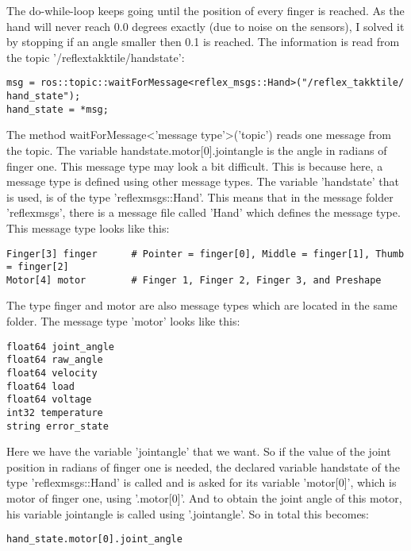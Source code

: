 \documentclass[11pt,a4paper]{report}
\begin{document}
The do-while-loop keeps going until the position of every finger is reached. As the hand will never reach 0.0 degrees exactly (due to noise on the sensors), I solved it by stopping if an angle smaller then 0.1 is reached. The information is read from the topic '/reflex\textunderscore takktile/hand\textunderscore state':
\begin{verbatim}
msg = ros::topic::waitForMessage<reflex_msgs::Hand>("/reflex_takktile/	hand_state");
hand_state = *msg;
\end{verbatim}
The method waitForMessage\textless 'message type'\textgreater ('topic') reads one message from the topic. The variable hand\textunderscore state.motor[0].joint\textunderscore angle is the angle in radians of finger one. This message type may look a bit difficult. This is because here, a message type is defined using other message types. The variable 'hand\textunderscore state' that is used, is of the type 'reflex\textunderscore msgs::Hand'. This means that in the message folder 'reflex\textunderscore msgs', there is a message file called 'Hand' which defines the message type. This message type looks like this:
\begin{verbatim}
Finger[3] finger      # Pointer = finger[0], Middle = finger[1], Thumb = finger[2]
Motor[4] motor        # Finger 1, Finger 2, Finger 3, and Preshape
\end{verbatim}
The type finger and motor are also message types which are located in the same folder. The message type 'motor' looks like this:
\begin{verbatim}
float64 joint_angle
float64 raw_angle
float64 velocity
float64 load
float64 voltage
int32 temperature
string error_state
\end{verbatim}
Here we have the variable 'joint\textunderscore angle' that we want. So if the value of the joint position in radians of finger one is needed, the declared variable hand\textunderscore state of the type 'reflex\textunderscore msgs::Hand' is called and is asked for its variable 'motor[0]', which is motor of finger one, using '.motor[0]'. And to obtain the joint angle of this motor, his variable joint\textunderscore angle is called using '.joint\textunderscore angle'. So in total this becomes:
\begin{verbatim}
hand_state.motor[0].joint_angle
\end{verbatim}
\newpage
\end{document}
